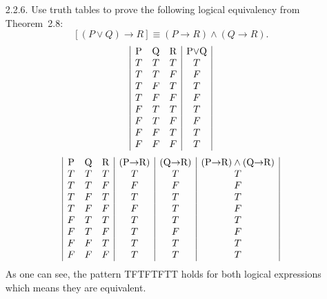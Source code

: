 \documentclass[12pt]{article}
\begin{document}
\begin{itemize}
\item[2.2.6.] Use truth tables to prove the following logical equivalency from Theorem~2.8:
\[
[(P\vee Q)\to R]\equiv (P\to R)\wedge (Q\to R).
\]
\begin{displaymath}
    \begin{array}{|c c c|c|}
        $P$ & $Q$ & $R$ & $P$\vee $Q$ \\
        T & T & T & T \\
        T & T & F & F \\
        T & F & T & T \\
        T & F & F & F \\
        F & T & T & T \\
        F & T & F & F \\
        F & F & T & T \\
        F & F & F & T \\
    \end{array}
\end{displaymath}
\begin{displaymath}
    \begin{array}{|c c c|c|c|c|}
        $P$ & $Q$ & $R$ & ($P$\rightarrow $R$) & ($Q$\rightarrow $R$) & ($P$\rightarrow $R$)\wedge ($Q$\rightarrow $R$) \\
        T & T & T & T & T & T \\
        T & T & F & F & F & F \\
        T & F & T & T & T & T \\
        T & F & F & F & T & F \\
        F & T & T & T & T & T \\
        F & T & F & T & F & F \\
        F & F & T & T & T & T \\
        F & F & F & T & T & T 
    \end{array}
\end{displaymath}
As one can see, the pattern TFTFTFTT holds for both logical expressions which means they are equivalent.

\hrulefill


\end{itemize}
\end{document}
